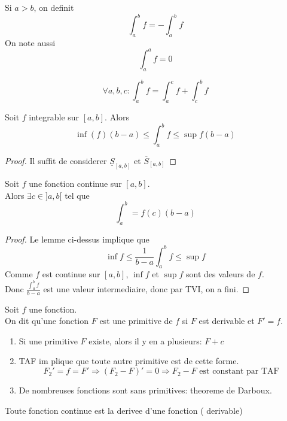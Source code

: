 \documentclass[../main.tex]{subfiles}
\begin{document}
\begin{rmq}
Si $a>b$, on definit
\[ 
\int_{ a }^{ b }f = - \int_{ a }^{ b }f
\]
On note aussi
\[ 
\int_{ a }^{ a }f=0
\]

\end{rmq}
\begin{crly}
\[ 
\forall a,b,c : \int_{ a }^{ b }f = \int_{ a }^{ c }f+ \int_{ c }^{ b }f
\]

\end{crly}
\begin{lemma}
	Soit $f$ integrable sur $[a,b] $. Alors 
	\[ 
		\inf ( f) ( b-a) \leq \int_{ a }^{ b }f \leq \sup f ( b-a) 
	\]
	
\end{lemma}
\begin{proof}
	Il suffit de considerer $\underline{S}_{[a,b]} $ et $\overline{S}_{[a,b]} $
\end{proof}
\begin{propo}
	Soit $f$ une fonction continue sur $[a,b]$.\\
	Alors $\exists c\in ] a,b[ $ tel que 
	\[ 
		\int_{ a }^{ b } = f( c) ( b-a) 
	\]
	
\end{propo}
\begin{proof}
Le lemme ci-dessus implique que
\[ 
\inf f\leq \frac{1}{b-a} \int_{ a }^{ b }f \leq \sup f
\]
Comme $f$ est continue sur $[a,b]$, $\inf f$ et $\sup f$ sont des valeurs de $f$.\\
Donc $\frac{\int_{a}^{b}f}{b-a}$ est une valeur intermediaire, donc par TVI, on a fini.
\end{proof}
\begin{defn}[Primitive]
Soit $f$ une fonction.\\
On dit qu'une fonction $F$ est une primitive de $f$ si $F$ est derivable et $F'=f$.
\end{defn}
\begin{rmq}
\begin{enumerate}
\item Si une primitive  $F$ existe, alors il y en a plusieurs: $F+c$
\item TAF im plique que toute autre primitive est de cette forme.
	\[ 
		F_2' = f = F' \Rightarrow ( F_2-F) ' = 0 \Rightarrow F_2 -F \text{ est constant par TAF } 
	\]
	
\item De nombreuses fonctions sont sans primitives: theoreme de Darboux.
\end{enumerate}

\end{rmq}
\begin{crly}
	Toute fonction continue est la derivee d'une fonction ( derivable) 
\end{crly}
\end{document}
